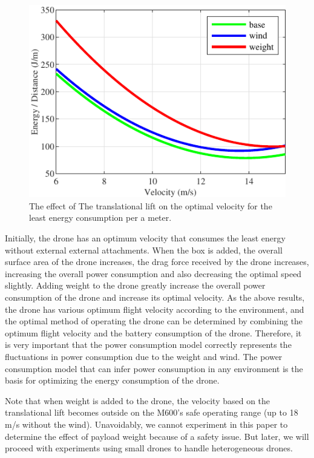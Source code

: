 \documentclass[journal]{./template/IEEEtran}
\begin{document}
\begin{figure}[ht]
\centering\includegraphics[scale=1.0]{fig10/t_lift.pdf}
\caption{The effect of The translational lift on the optimal velocity for the least energy consumption per a meter.}
\label{fig: lift}
\end{figure}

Initially, the drone has an optimum velocity that consumes the least energy without external external attachments. 
When the box is added, the overall surface area of the drone increases, the drag force received by the drone increases, increasing the overall power consumption and also decreasing the optimal speed slightly. 
Adding weight to the drone greatly increase the overall power consumption of the drone and increase its optimal velocity.
As the above results, the drone has various optimum flight velocity according to the environment, and the optimal method of operating the drone can be determined by combining the optimum flight velocity and the battery consumption of the drone. 
Therefore, it is very important that the power consumption model correctly represents the fluctuations in power consumption due to the weight and wind. 
The power consumption model that can infer power consumption in any environment is the basis for optimizing the energy consumption of the drone.

Note that when weight is added to the drone, the velocity based on the translational lift becomes outside on the M600's safe operating range (up to 18 m/s without the wind). Unavoidably, we cannot experiment in this paper to determine the effect of payload weight because of a safety issue. But later, we will proceed with experiments using small drones to handle heterogeneous drones.
\end{document}
